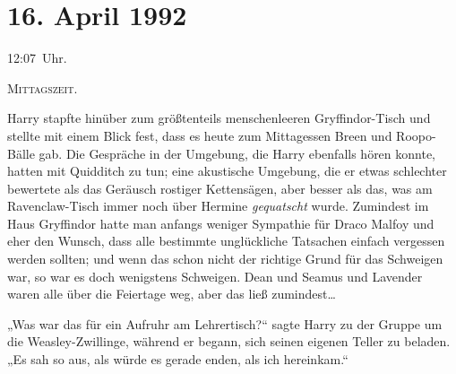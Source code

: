 
\section{16. April 1992}

12:07~Uhr.

\lettrine{M}{ittagszeit.}

\hplettrineextrapara
Harry stapfte hinüber zum größtenteils menschenleeren Gryffindor-Tisch und stellte mit einem Blick fest, dass es heute zum Mittagessen Breen und Roopo-Bälle gab. Die Gespräche in der Umgebung, die Harry ebenfalls hören konnte, hatten mit Quidditch zu tun; eine akustische Umgebung, die er etwas schlechter bewertete als das Geräusch rostiger Kettensägen, aber besser als das, was am Ravenclaw-Tisch immer noch über Hermine \emph{gequatscht} wurde. Zumindest im Haus Gryffindor hatte man anfangs weniger Sympathie für Draco Malfoy und eher den Wunsch, dass alle bestimmte unglückliche Tatsachen einfach vergessen werden sollten; und wenn das schon nicht der richtige Grund für das Schweigen war, so war es doch wenigstens Schweigen. Dean und Seamus und Lavender waren alle über die Feiertage weg, aber das ließ zumindest…

„Was war das für ein Aufruhr am Lehrertisch?“ sagte Harry zu der Gruppe um die Weasley-Zwillinge, während er begann, sich seinen eigenen Teller zu beladen.
„Es sah so aus, als würde es gerade enden, als ich hereinkam.“

